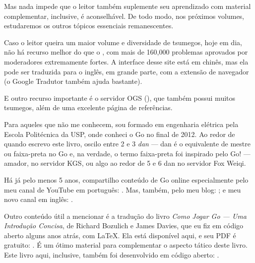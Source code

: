 Mas nada impede que o leitor também suplemente seu aprendizado com material complementar, inclusive, é aconselhável. De todo modo, nos próximos volumes, estudaremos os outros tópicos essenciais remanescentes.

Caso o leitor queira um maior volume e diversidade de tsumegos, hoje em dia, não há recurso melhor do que o , com mais de 160,000 problemas aprovados por moderadores extremamente fortes. A interface desse site está em chinês, mas ela pode ser traduzida para o inglês, em grande parte, com a extensão de navegador  (o Google Tradutor também ajuda bastante).

E outro recurso importante é o servidor OGS (), que também possui muitos tsumegos, além de uma excelente página de referências.




Para aqueles que não me conhecem, sou formado em engenharia elétrica pela Escola Politécnica da USP, onde conheci o Go no final de 2012. Ao redor de quando escrevo este livro, oscilo entre 2 e 3 \emph{dan} --- dan é o equivalente de mestre ou faixa-preta no Go e, na verdade, o termo faixa-preta foi inspirado pelo Go! --- amador, no servidor KGS, ou algo ao redor de 5 e 6 dan no servidor Fox Weiqi.

Há já pelo menos 5 anos, compartilho conteúdo de Go online especialmente pelo meu canal de YouTube em português: . Mas, também, pelo meu blog: ; e meu novo canal em inglês: .

Outro conteúdo útil a mencionar é a tradução do livro \emph{Como Jogar Go --- Uma Introdução Concisa}, de Richard Bozulich e James Davies, que eu fiz em código aberto alguns anos atrás, com \LaTeX. Ela está disponível aqui, e seu PDF é gratuito: . É um ótimo material para complementar o aspecto tático deste livro. Este livro aqui, inclusive, também foi desenvolvido em código aberto: .

